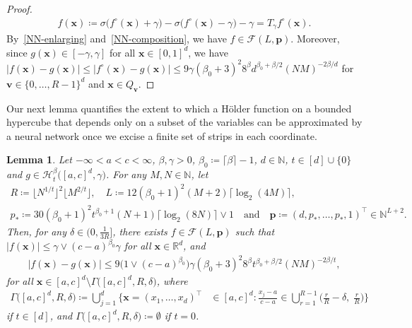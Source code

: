 \documentclass[12pt]{article}
\newtheorem{lemma}[thm]{Lemma}
\begin{document}
\begin{proof}
    \begin{align*}
        f(\bm x) \coloneqq \sigma\bigl(f^\circ(\bm x) + \gamma\bigr) - \sigma\bigl(f^\circ(\bm x) - \gamma\bigr) - \gamma = T_{\gamma}f^\circ(\bm x).
    \end{align*}
    By~\ref{NN-enlarging} and~\ref{NN-composition}, we have $f\in\mathcal{F}(L,\bm p)$. Moreover, since $g(\bm x) \in [-\gamma,\gamma]$ for all $\bm x \in [0,1]^d$, we have $|f(\bm x) - g(\bm x)| \leq |f^\circ(\bm x) - g(\bm x)| \leq 9\gamma (\beta_0+3)^2 8^{\beta} d^{\beta_0+\beta/2} (NM)^{-2\beta/d}$ for $\bm v \in \{0,\ldots,R-1\}^d$ and $\bm x \in Q_{\bm v}$.
\end{proof}


Our next lemma quantifies the extent to which a H\"older function on a bounded hypercube that depends only on a subset of the variables can be approximated by a neural network once we excise a finite set of strips in each coordinate.
\begin{lemma} \label{lemma:approximate-Holder-functions-[a,c]^d}
    Let $-\infty < a < c < \infty$, $\beta,\gamma>0$, $\beta_0 \coloneqq \lceil \beta \rceil - 1$, $d\in\mathbb{N}$, $t\in[d]\cup\{0\}$ and $g\in\mathcal{H}_t^{\beta}\bigl([a,c]^d,\gamma\bigr)$. For any $M,N\in\mathbb{N}$, let 
    \begin{gather*}
        R\coloneqq \lfloor N^{1/t} \rfloor^2 \lfloor M^{2/t} \rfloor,\quad L\coloneqq 12(\beta_0+1)^2(M+2)\lceil \log_2(4M) \rceil,\\
        p_* \coloneqq 30(\beta_0+1)^2 t^{\beta_0+1} (N+1) \lceil\log_2(8N)\rceil \vee 1 \quad\text{and}\quad \bm p \coloneqq (d,p_*,\ldots,p_*,1)^\top \in \mathbb{N}^{L+2}.
    \end{gather*}
    Then, for any $\delta \in \bigl(0, \frac{1}{3R}\bigr]$, there exists $f\in\mathcal{F}(L,\bm p)$ such that $|f(\bm x)| \leq \gamma \vee (c-a)^{\beta_0}\gamma$ for all $\bm x \in \mathbb{R}^d$, and
    \begin{align*}
        |f(\bm x) - g(\bm x)| \leq 9\bigl(1 \vee (c-a)^{\beta_0}\bigr)\gamma (\beta_0+3)^2 8^{\beta} t^{\beta_0+\beta/2} (NM)^{-2\beta/t},
    \end{align*}
    for all $\bm x \in [a,c]^d \setminus \Gamma\bigl( [a,c]^d, R, \delta \bigr)$, where
    \begin{align*}
        \Gamma\bigl( [a,c]^d, R, \delta \bigr) \coloneqq \bigcup_{j=1}^d \biggl\{ \bm x = (x_1,\ldots,x_d)^\top &\in [a,c]^d : \frac{x_j-a}{c-a} \in \bigcup_{r=1}^{R-1} \biggl( \frac{r}{R} - \delta,\; \frac{r}{R} \biggr) \biggr\}
    \end{align*}
    if $t \in [d]$, and $\Gamma\bigl( [a,c]^d, R, \delta \bigr) \coloneqq \emptyset$ if $t=0$.
\end{lemma}
\end{document}

